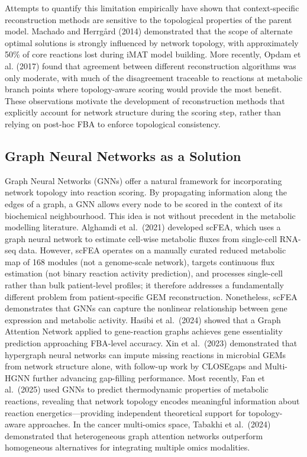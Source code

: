 \documentclass[12pt,a4paper]{article}
\begin{document}
Attempts to quantify this limitation empirically have shown that context-specific reconstruction methods are sensitive to the topological properties of the parent model. Machado and Herrg\r{a}rd (2014) demonstrated that the scope of alternate optimal solutions is strongly influenced by network topology, with approximately 50\% of core reactions lost during iMAT model building. More recently, Opdam et al. (2017) found that agreement between different reconstruction algorithms was only moderate, with much of the disagreement traceable to reactions at metabolic branch points where topology-aware scoring would provide the most benefit. These observations motivate the development of reconstruction methods that explicitly account for network structure during the scoring step, rather than relying on post-hoc FBA to enforce topological consistency.

\subsection{Graph Neural Networks as a Solution}

Graph Neural Networks (GNNs) offer a natural framework for incorporating network topology into reaction scoring. By propagating information along the edges of a graph, a GNN allows every node to be scored in the context of its biochemical neighbourhood. This idea is not without precedent in the metabolic modelling literature. Alghamdi et al.\ (2021) developed scFEA, which uses a graph neural network to estimate cell-wise metabolic fluxes from single-cell RNA-seq data. However, scFEA operates on a manually curated reduced metabolic map of 168 modules (not a genome-scale network), targets continuous flux estimation (not binary reaction activity prediction), and processes single-cell rather than bulk patient-level profiles; it therefore addresses a fundamentally different problem from patient-specific GEM reconstruction. Nonetheless, scFEA demonstrates that GNNs can capture the nonlinear relationship between gene expression and metabolic activity. Hasibi et al.\ (2024) showed that a Graph Attention Network applied to gene-reaction graphs achieves gene essentiality prediction approaching FBA-level accuracy. Xin et al.\ (2023) demonstrated that hypergraph neural networks can impute missing reactions in microbial GEMs from network structure alone, with follow-up work by CLOSEgaps \cite{CLOSEgaps2024} and Multi-HGNN \cite{MultiHGNN2025} further advancing gap-filling performance. Most recently, Fan et al.\ (2025) \cite{Fan2025} used GNNs to predict thermodynamic properties of metabolic reactions, revealing that network topology encodes meaningful information about reaction energetics---providing independent theoretical support for topology-aware approaches. In the cancer multi-omics space, Tabakhi et al.\ (2024) \cite{Tabakhi2024} demonstrated that heterogeneous graph attention networks outperform homogeneous alternatives for integrating multiple omics modalities.
\end{document}
